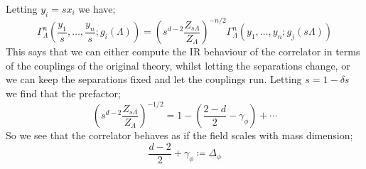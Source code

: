 Letting $y_i = sx_i$ we have;
\begin{equation*}
\Gamma_{\Lambda}^{n}\left(\frac{y_1}{s}, \ldots, \frac{y_n}{s}; g_i(\Lambda)\right) = \left(s^{d - 2}\frac{Z_{s\Lambda}}{Z_\Lambda}\right)^{-n/2}\Gamma_{\Lambda}^{n}\left(y_1, \ldots, y_n ; g_j(s\Lambda)\right)
\end{equation*}
This says that we can either compute the IR behaviour of the correlator in terms of the couplings of the original theory, whilst letting the separations change, or we can keep the separations fixed and let the couplings run. Letting $s = 1 - \delta s$ we find that the prefactor;
\begin{equation*}
\left(s^{d - 2}\frac{Z_{s\Lambda}}{Z_\Lambda}\right)^{-1/2} = 1 - \left(\frac{2 - d}{2} - \gamma_\phi \right) + \cdots
\end{equation*}
So we see that the correlator behaves as if the field scales with mass dimension;
\begin{equation}
\frac{d - 2}{2} + \gamma_\phi \coloneqq \Delta_{\phi}
\end{equation}
